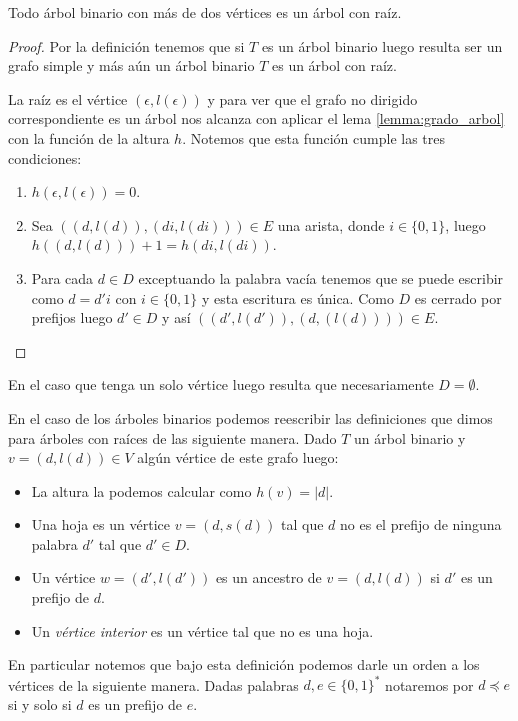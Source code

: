\documentclass[tesis.tex]{subfiles}
\begin{document}
\begin{leoenv}
\begin{prop}
	Todo árbol binario con más de dos vértices es un árbol con raíz.
\end{prop}

\begin{proof}
	Por la definición tenemos que si $T$ es un árbol binario luego resulta ser un grafo simple y más aún un árbol binario $T$ es un árbol con raíz.
	
	La raíz es el vértice $(\epsilon, l(\epsilon))$ y para ver que el grafo no dirigido correspondiente es un árbol nos alcanza con aplicar el lema \ref{lemma:grado_arbol} con la función de la altura $h$.
	Notemos que esta función cumple las tres condiciones:
	\begin{enumerate}
		\item $h(\epsilon,l(\epsilon)) = 0$.
		\item Sea $((d,l(d)),(di,l(di))) \in E$ una arista, donde $i \in \{0,1\}$, 
		luego $h((d,l(d)))+1 = h(di,l(di))$.
		\item Para cada $d \in D$ exceptuando la palabra vacía tenemos que se puede escribir como $d = d'i$ con $i \in \{0,1\}$ y esta escritura es única. 
		Como $D$ es cerrado por prefijos luego $d' \in D$ y así $((d',l(d')),(d,(l(d)))) \in E$.
	\end{enumerate}
\end{proof}

\begin{obs}
	En el caso que tenga un solo vértice luego resulta que necesariamente $D = \emptyset$.
\end{obs}

En el caso de los árboles binarios podemos reescribir las definiciones que dimos para árboles con raíces de las siguiente manera.
Dado $T$ un árbol binario y $v = (d,l(d)) \in V$ algún vértice de este grafo luego:
\begin{itemize}
	\item La altura la podemos calcular como $h(v) = |d|$.
	\item Una hoja es un vértice $v = (d,s(d))$ tal que $d$ no es el prefijo de ninguna palabra $d'$ tal que $d' \in D$.
	\item Un vértice $w = (d',l(d'))$ es un ancestro de $v = (d,l(d))$ si $d'$ es un prefijo de $d$.
	\item Un \emph{vértice interior} es un vértice tal que no es una hoja.
\end{itemize}

En particular notemos que bajo esta definición podemos darle un orden a los vértices de la siguiente manera.
Dadas palabras $d,e \in \{0,1\}^{*}$ notaremos por $d \preceq e$ si y solo si $d$ es un prefijo de $e$.


\end{leoenv}
\end{document}
